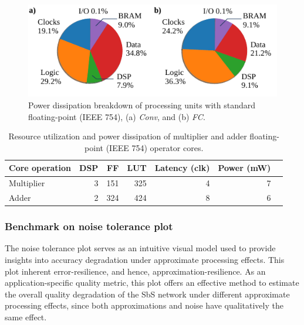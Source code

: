 \begin{figure}[!h]
	\centering
	\includegraphics[width=1\columnwidth]{../figures/power_dissipation_breakdown_float-32.pdf}
	\caption{Power dissipation breakdown of processing units with standard floating-point (IEEE 754), (a) \emph{Conv}, and (b) \emph{FC}.}
	\label{fig:power_dissipation_breakdown_float_32}
\end{figure}


\begin{table}[!h]\centering
	\caption{Resource utilization and power dissipation of multiplier and adder floating-point (IEEE 754) operator cores.}\label{tab:LogiCORE}
	\scriptsize
	\begin{tabular}{lrrrrrr}\toprule
		\textbf{Core operation} &\textbf{DSP} &\textbf{FF} &\textbf{LUT} &\textbf{Latency (clk)} &\textbf{Power (mW)} \\\midrule
		Multiplier &3 &151 &325 &4 &7 \\
		Adder &2 &324 &424 &8 &6 \\
		\bottomrule
	\end{tabular}
\end{table}

\subsubsection{Benchmark on noise tolerance plot}
The noise tolerance plot serves as an intuitive visual model used to provide insights into accuracy degradation under approximate processing effects. This plot  inherent error-resilience, and hence, approximation-resilience. As an application-specific quality metric, this plot offers an effective method to estimate the overall quality degradation of the SbS network under different approximate processing effects, since both approximations and noise have qualitatively the same effect\cite{venkataramani2015approximate}.

